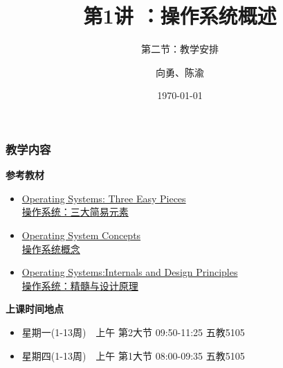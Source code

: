 \documentclass[UTF8]{ctexbeamer}
\title[第1讲]{第1讲 ：操作系统概述} %
\subtitle{第二节：教学安排}
\author{向勇、陈渝} %
\institute[清华大学] %
{
清华大学计算机系 \\ %
\medskip
\textit{xyong,yuchen@tsinghua.edu.cn} %
}
\date{\today} %
\begin{document}
\begin{frame}
\titlepage %
\end{frame}

%
%
\begin{frame}
	\frametitle{教学内容}
	
%		
			\textbf{参考教材}
			\begin{itemize}
				\item \href{http://www.ostep.org/}{Operating Systems: Three Easy Pieces \\ 操作系统：三大简易元素}
				\item \href{http://item.jd.com/10553956.html}{Operating System Concepts \\ 操作系统概念}
				\item \href{http://item.jd.com/10255221.html}{Operating Systems:Internals and Design Principles \\ 操作系统：精髓与设计原理}
			\end{itemize}
		
			\textbf{上课时间地点}
			\begin{itemize}
				\item 星期一(1-13周)　上午 第2大节  09:50-11:25  五教5105
				\item 星期四(1-13周)　上午 第1大节  08:00-09:35  五教5105
		    \end{itemize}
%		
%			
%			
%		
	
\end{frame}
\end{document}
